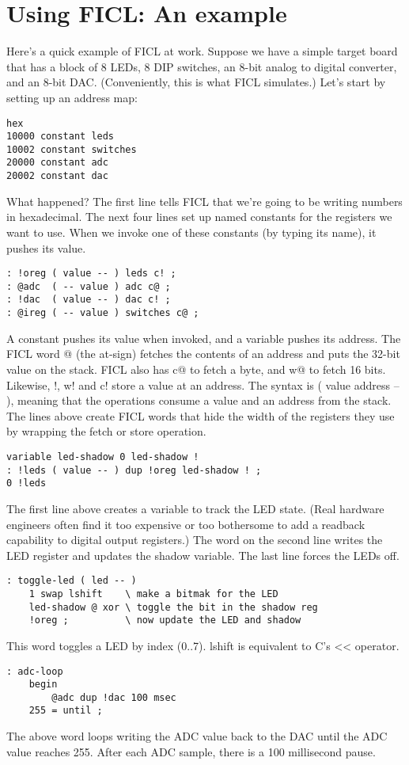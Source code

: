 \section{Using FICL: An example}
Here's a quick example of FICL at work. Suppose we have a simple target
board that has a block of 8 LEDs, 8 DIP switches, an 8-bit analog to
digital converter, and an 8-bit DAC. (Conveniently, this is what FICL
simulates.) Let's start by setting up an address map:
\begin{lstlisting}[frame=single]
hex
10000 constant leds
10002 constant switches
20000 constant adc
20002 constant dac
\end{lstlisting}
What happened? The first line tells FICL that we're going to be writing
numbers in hexadecimal. The next four lines set up named constants for
the registers we want to use. When we invoke one of these constants (by
typing its name), it pushes its value.
\begin{lstlisting}[frame=single]
: !oreg ( value -- ) leds c! ;
: @adc  ( -- value ) adc c@ ;
: !dac  ( value -- ) dac c! ;
: @ireg ( -- value ) switches c@ ;
\end{lstlisting}
A constant pushes its value when invoked, and a variable pushes its
address. The FICL word @ (the at-sign) fetches the contents of an
address and puts the 32-bit value on the stack. FICL also has c@ to
fetch a byte, and w@ to fetch 16 bits. Likewise, !, w! and c! store
a value at an address. The syntax is ( value address -- ), meaning that
the operations consume a value and an address from the stack. The lines
above create FICL words that hide the width of the registers they use by
wrapping the fetch or store operation.
\begin{lstlisting}[frame=single]
variable led-shadow 0 led-shadow !
: !leds ( value -- ) dup !oreg led-shadow ! ;
0 !leds
\end{lstlisting}
The first line above creates a variable to track the LED state. (Real
hardware engineers often find it too expensive or too bothersome to add
a readback capability to digital output registers.) The word on the
second line writes the LED register and updates the shadow variable.
The last line forces the LEDs off.
\begin{lstlisting}[frame=single]
: toggle-led ( led -- )
	1 swap lshift    \ make a bitmak for the LED
	led-shadow @ xor \ toggle the bit in the shadow reg
	!oreg ;          \ now update the LED and shadow
\end{lstlisting}
This word toggles a LED by index (0..7). lshift is equivalent to C's
<< operator.
\begin{lstlisting}[frame=single]
: adc-loop
	begin
		@adc dup !dac 100 msec
	255 = until ;
\end{lstlisting}
The above word loops writing the ADC value back to the DAC until the
ADC value reaches 255. After each ADC sample, there is a 100  millisecond
pause.

